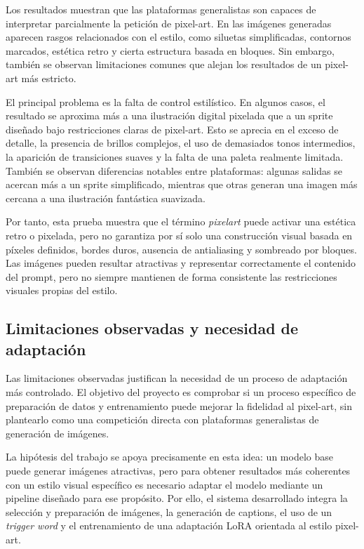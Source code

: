 \documentclass[a4paper,11pt,titlepage]{scrbook}
\begin{document}
Los resultados muestran que las plataformas generalistas son capaces de interpretar parcialmente la petición de pixel-art. En las imágenes generadas aparecen rasgos relacionados con el estilo, como siluetas simplificadas, contornos marcados, estética retro y cierta estructura basada en bloques. Sin embargo, también se observan limitaciones comunes que alejan los resultados de un pixel-art más estricto.

\medskip

El principal problema es la falta de control estilístico. En algunos casos, el resultado se aproxima más a una ilustración digital pixelada que a un sprite diseñado bajo restricciones claras de pixel-art. Esto se aprecia en el exceso de detalle, la presencia de brillos complejos, el uso de demasiados tonos intermedios, la aparición de transiciones suaves y la falta de una paleta realmente limitada. También se observan diferencias notables entre plataformas: algunas salidas se acercan más a un sprite simplificado, mientras que otras generan una imagen más cercana a una ilustración fantástica suavizada.

\medskip

Por tanto, esta prueba muestra que el término \textit{pixelart} puede activar una estética retro o pixelada, pero no garantiza por sí solo una construcción visual basada en píxeles definidos, bordes duros, ausencia de antialiasing y sombreado por bloques. Las imágenes pueden resultar atractivas y representar correctamente el contenido del prompt, pero no siempre mantienen de forma consistente las restricciones visuales propias del estilo.

\subsection{Limitaciones observadas y necesidad de adaptación}

Las limitaciones observadas justifican la necesidad de un proceso de adaptación más controlado. El objetivo del proyecto es comprobar si un proceso específico de preparación de datos y entrenamiento puede mejorar la fidelidad al pixel-art, sin plantearlo como una competición directa con plataformas generalistas de generación de imágenes.

\medskip

La hipótesis del trabajo se apoya precisamente en esta idea: un modelo base puede generar imágenes atractivas, pero para obtener resultados más coherentes con un estilo visual específico es necesario adaptar el modelo mediante un pipeline diseñado para ese propósito. Por ello, el sistema desarrollado integra la selección y preparación de imágenes, la generación de captions, el uso de un \textit{trigger word} y el entrenamiento de una adaptación LoRA orientada al estilo pixel-art.
\end{document}
